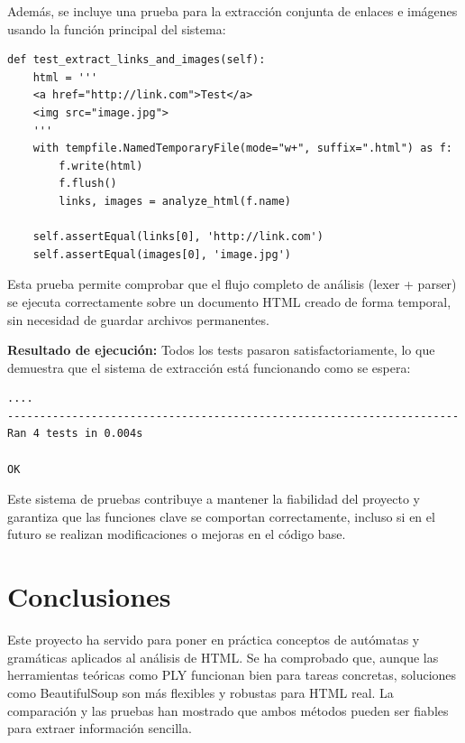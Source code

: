 \documentclass[11pt,a4paper]{article}
\begin{document}
Además, se incluye una prueba para la extracción conjunta de enlaces e imágenes usando la función principal del sistema:

\begin{verbatim}
def test_extract_links_and_images(self):
    html = '''
    <a href="http://link.com">Test</a>
    <img src="image.jpg">
    '''
    with tempfile.NamedTemporaryFile(mode="w+", suffix=".html") as f:
        f.write(html)
        f.flush()
        links, images = analyze_html(f.name)

    self.assertEqual(links[0], 'http://link.com')
    self.assertEqual(images[0], 'image.jpg')
\end{verbatim}

\medskip

Esta prueba permite comprobar que el flujo completo de análisis (lexer + parser) se ejecuta correctamente sobre un documento HTML creado de forma temporal, sin necesidad de guardar archivos permanentes.

\medskip

\textbf{Resultado de ejecución:} Todos los tests pasaron satisfactoriamente, lo que demuestra que el sistema de extracción está funcionando como se espera:

\begin{verbatim}
....
----------------------------------------------------------------------
Ran 4 tests in 0.004s

OK
\end{verbatim}

\medskip

Este sistema de pruebas contribuye a mantener la fiabilidad del proyecto y garantiza que las funciones clave se comportan correctamente, incluso si en el futuro se realizan modificaciones o mejoras en el código base.


\section{Conclusiones}

Este proyecto ha servido para poner en práctica conceptos de autómatas y gramáticas aplicados al análisis de HTML. Se ha comprobado que, aunque las herramientas teóricas como PLY funcionan bien para tareas concretas, soluciones como BeautifulSoup son más flexibles y robustas para HTML real. La comparación y las pruebas han mostrado que ambos métodos pueden ser fiables para extraer información sencilla.
\end{document}
